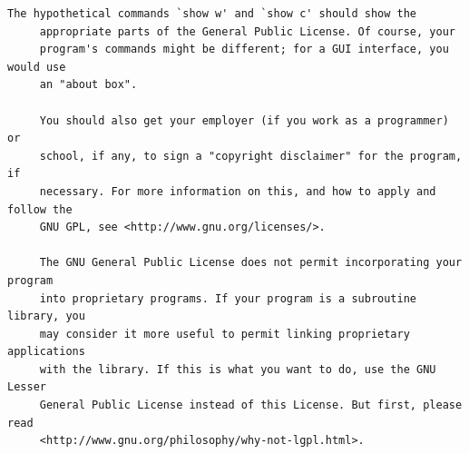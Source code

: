 \begin{lstlisting}[basicstyle=\ttfamily\footnotesize,breaklines=true]
     The hypothetical commands `show w' and `show c' should show the
     appropriate parts of the General Public License. Of course, your
     program's commands might be different; for a GUI interface, you would use
     an "about box".

     You should also get your employer (if you work as a programmer) or
     school, if any, to sign a "copyright disclaimer" for the program, if
     necessary. For more information on this, and how to apply and follow the
     GNU GPL, see <http://www.gnu.org/licenses/>.

     The GNU General Public License does not permit incorporating your program
     into proprietary programs. If your program is a subroutine library, you
     may consider it more useful to permit linking proprietary applications
     with the library. If this is what you want to do, use the GNU Lesser
     General Public License instead of this License. But first, please read
     <http://www.gnu.org/philosophy/why-not-lgpl.html>.
\end{lstlisting}

